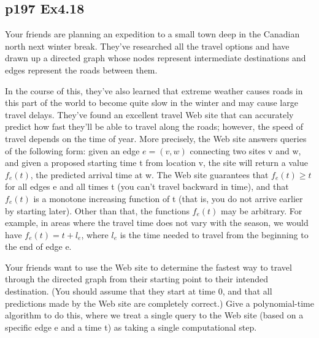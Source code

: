 \documentclass[a4paper]{article}
\begin{document}
\subsection*{p197 Ex4.18}
\begin{adjustwidth}{1cm}{1cm}
	Your friends are planning an expedition to a small town deep in the Canadian
	north next winter break. They've researched all the travel options
	and have drawn up a directed graph whose nodes represent intermediate
	destinations and edges represent the roads between them.
	\par In the course of this, they've also learned that extreme weather causes
	roads in this part of the world to become quite slow in the winter and
	may cause large travel delays. They’ve found an excellent travel Web site
	that can accurately predict how fast they’ll be able to travel along the
	roads; however, the speed of travel depends on the time of year. More
	precisely, the Web site answers queries of the following form: given an
	edge $e = (v, w)$ connecting two sites v and w, and given a proposed starting
	time t from location v, the site will return a value $f_e(t)$, the predicted
	arrival time at w. The Web site guarantees that $f_e(t)\geq t$ for all edges e
	and all times t (you can’t travel backward in time), and that $f_e(t)$ is a
	monotone increasing function of t (that is, you do not arrive earlier by
	starting later). Other than that, the functions $f_e(t)$ may be arbitrary. For
	example, in areas where the travel time does not vary with the season,
	we would have $f_e(t) = t + l_e$, where $l_e$ is the time needed to travel from the
	beginning to the end of edge e.
	\par Your friends want to use the Web site to determine the fastest way
	to travel through the directed graph from their starting point to their
	intended destination. (You should assume that they start at time 0, and
	that all predictions made by the Web site are completely correct.) Give a
	polynomial-time algorithm to do this, where we treat a single query to
	the Web site (based on a specific edge e and a time t) as taking a single
	computational step.
\end{adjustwidth}
\end{document}
